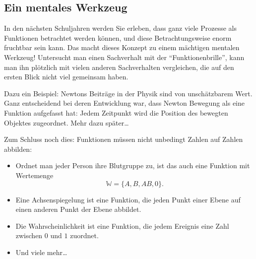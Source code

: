 \subsection*{Ein mentales Werkzeug}

In den nächsten Schuljahren werden Sie erleben, dass ganz viele
Prozesse als Funktionen betrachtet werden können, und diese
Betrachtungsweise enorm fruchtbar sein kann. Das macht dieses
Konzept zu einem mächtigen mentalen Werkzeug! Untersucht man
einen Sachverhalt mit der \enquote{Funktionenbrille}, kann man
ihn plötzlich mit vielen anderen Sachverhalten vergleichen, die
auf den ersten Blick nicht viel gemeinsam haben.

Dazu ein Beispiel: Newtons Beiträge in der Physik sind von
unschätzbarem Wert. Ganz entscheidend bei deren Entwicklung
war, dass Newton Bewegung als eine Funktion aufgefasst hat:
Jedem Zeitpunkt wird die Position des bewegten Objektes
zugeordnet. Mehr dazu später\ldots

Zum Schluss noch dies: Funktionen müssen nicht unbedingt
Zahlen auf Zahlen abbilden:

\begin{itemize}
    \item Ordnet man jeder Person ihre Blutgruppe zu, ist das
          auch eine Funktion mit Wertemenge
          \[
              \mathbb{W}=\{A,B,AB,0\}.
          \]

    \item Eine Achsenspiegelung ist eine Funktion, die jeden
          Punkt einer Ebene auf einen anderen Punkt der Ebene
          abbildet.

    \item Die Wahrscheinlichkeit ist eine Funktion, die jedem
          Ereignis eine Zahl zwischen \(0\) und \(1\) zuordnet.

    \item Und viele mehr\ldots
\end{itemize}


